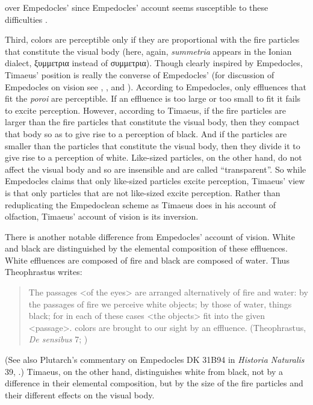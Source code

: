 over Empedocles' since Empedocles' account seems susceptible to these difficulties \citep[6]{Kalderon:2015fr}.

Third, colors are perceptible only if they are proportional with the fire particles that constitute the visual body (here, again, \emph{summetria} appears in the Ionian dialect, {\sbl ξυμμετρια} instead of {\sbl συμμετρια}). Though clearly inspired by Empedocles, Timaeus' position is really the converse of Empedocles' (for discussion of Empedocles on vision see \citealt{Sedley:1992uq}, \citealt{Ierodiakonou:2005fk}, and \citealt[chapter 1]{Kalderon:2015fr}). According to Empedocles, only effluences that fit the \emph{poroi} are perceptible. If an effluence is too large or too small to fit it fails to excite perception. However, according to Timaeus, if the fire particles are larger than the fire particles that constitute the visual body, then they compact that body so as to give rise to a perception of black. And if the particles are smaller than the particles that constitute the visual body, then they divide it to give rise to a perception of white. Like-sized particles, on the other hand, do not affect the visual body and so are insensible and are called ``transparent''. So while Empedocles claims that only like-sized particles excite perception, Timaeus' view is that only particles that are not like-sized excite perception. Rather than reduplicating the Empedoclean scheme as Timaeus does in his account of olfaction, Timaeus' account of vision is its inversion.

There is another notable difference from Empedocles' account of vision. White and black are distinguished by the elemental composition of these effluences. White effluences are composed of fire and black are composed of water. Thus Theophrastus writes: 
\begin{quote}
	The passages <of the eyes> are arranged alternatively of fire and water: by the passages of fire we perceive white objects; by those of water, things black; for in each of these cases <the objects> fit into the given <passage>. colors are brought to our sight by an effluence. (Theophrastus, \emph{De sensibus} 7; \citealt[71--3]{Stratton:1917vn})
\end{quote}
(See also Plutarch's commentary on Empedocles DK 31B94 in \emph{Historia Naturalis} 39, \citealt[CTXT-87 137--8]{Inwood:2001ve}.) Timaeus, on the other hand, distinguishes white from black, not by a difference in their elemental composition, but by the size of the fire particles and their different effects on the visual body. 


